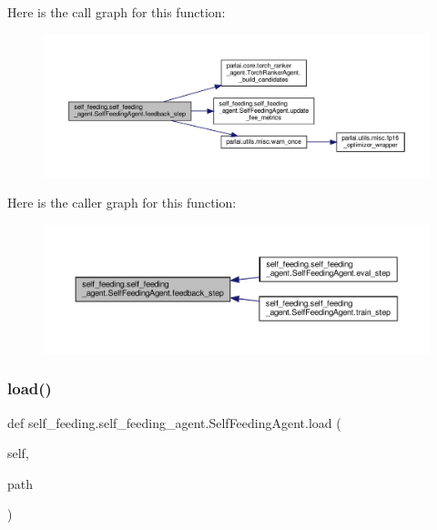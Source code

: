 Here is the call graph for this function\+:
\nopagebreak
\begin{figure}[H]
\begin{center}
\leavevmode
\includegraphics[width=350pt]{classself__feeding_1_1self__feeding__agent_1_1SelfFeedingAgent_a7a3807c6692b7a628fa1477d99b73e0b_cgraph}
\end{center}
\end{figure}
Here is the caller graph for this function\+:
\nopagebreak
\begin{figure}[H]
\begin{center}
\leavevmode
\includegraphics[width=350pt]{classself__feeding_1_1self__feeding__agent_1_1SelfFeedingAgent_a7a3807c6692b7a628fa1477d99b73e0b_icgraph}
\end{center}
\end{figure}
\mbox{\label{classself__feeding_1_1self__feeding__agent_1_1SelfFeedingAgent_a50e6f81560e522b6178f913bb3f1258a}} 
\subsubsection{\texorpdfstring{load()}{load()}}
{\footnotesize\ttfamily def self\+\_\+feeding.\+self\+\_\+feeding\+\_\+agent.\+Self\+Feeding\+Agent.\+load (\begin{DoxyParamCaption}\item[{}]{self,  }\item[{}]{path }\end{DoxyParamCaption})}

